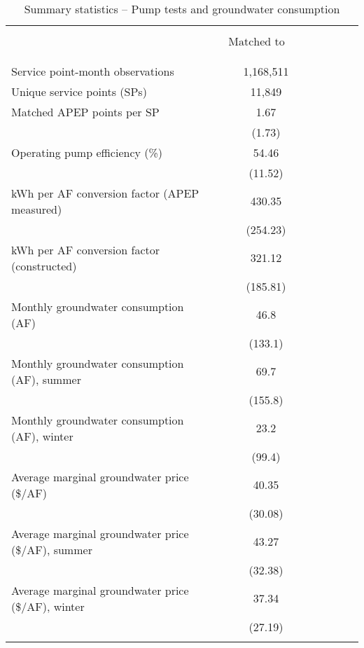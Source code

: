\begin{table}\centering
\caption{\normalsize Summary statistics -- Pump tests and groundwater consumption}
\label{tab:water_summary_stats}
\begin{tabular}{lrcrcrr}
\hline
\hline
\\ 
\vspace{-8mm}
\\
&& $\begin{matrix}\text{Matched to Pumps}\end{matrix}$ \\
[.1em]
\cline{2-3}
\\
\vspace{-7mm}
\\
Service point-month observations && 1,168,511 \\ 
[.2em]
Unique service points (SPs) && 11,849 \\ 
[1.4em]
Matched APEP points per SP && 1.67 \\ 
 && (1.73) \\
[.4em]
Operating pump efficiency (\%) && 54.46   \\
 && (11.52)   \\
[.4em]
kWh per AF conversion factor (APEP measured) && 430.35   \\
 && (254.23)   \\
[.4em]
kWh per AF conversion factor (constructed) && 321.12   \\
 && (185.81)   \\
[1.4em]
Monthly groundwater consumption (AF) && 46.8   \\
 && (133.1)   \\
[.4em]
Monthly groundwater consumption (AF), summer && 69.7   \\
 && (155.8)   \\
[.4em]
Monthly groundwater consumption (AF), winter && 23.2   \\
 && (99.4)   \\
[1.4em]
Average marginal groundwater price (\$/AF) && 40.35   \\
 && (30.08)   \\
[.4em]
Average marginal groundwater price (\$/AF), summer && 43.27   \\
 && (32.38)   \\
[.4em]
Average marginal groundwater price (\$/AF), winter && 37.34   \\
 && (27.19)   \\
[.2em]
\hline
\vspace{-2mm}
\end{tabular}

\end{table}
